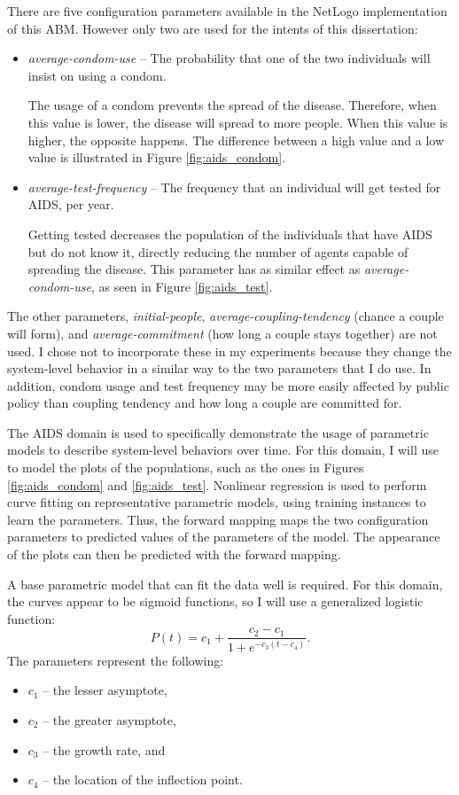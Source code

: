 There are five configuration parameters available in the NetLogo implementation of this ABM.
However only two are used for the intents of this dissertation:
\begin{itemize}
  \item \textit{average-condom-use} -- The probability that one of the two individuals will insist on using a condom.

The usage of a condom prevents the spread of the disease.
Therefore, when this value is lower, the disease will spread to more people.
When this value is higher, the opposite happens.
The difference between a high value and a low value is illustrated in Figure \ref{fig:aids_condom}.

  \item \textit{average-test-frequency} -- The frequency that an individual will get tested for AIDS, per year.

Getting tested decreases the population of the individuals that have AIDS but do not know it, directly reducing the number of agents capable of spreading the disease.
This parameter has as similar effect as \textit{average-condom-use}, as seen in Figure \ref{fig:aids_test}.
\end{itemize}
The other parameters, \textit{initial-people}, \textit{average-coupling-tendency} (chance a couple will form), and \textit{average-commitment} (how long a couple stays together) are not used.
I chose not to incorporate these in my experiments because they change the system-level behavior in a similar way to the two parameters that I do use.
In addition, condom usage and test frequency may be more easily affected by public policy than coupling tendency and how long a couple are committed for.

The AIDS domain is used to specifically demonstrate the usage of parametric models to describe system-level behaviors over time.
For this domain, I will use \fw to model the plots of the populations, such as the ones in Figures \ref{fig:aids_condom} and \ref{fig:aids_test}.
Nonlinear regression is used to perform curve fitting on representative parametric models, using training instances to learn the parameters.
Thus, the forward mapping maps the two configuration parameters to predicted values of the parameters of the model.
The appearance of the plots can then be predicted with the forward mapping.

A base parametric model that can fit the data well is required.
For this domain, the curves appear to be sigmoid functions, so I will use a generalized logistic function:
\[P(t) = c_1 + \displaystyle\frac{c_2 - c_1}{1 + e^{-c_3 (t - c_4)}}.\]
The parameters represent the following:
\begin{itemize}
 \item $c_1$ -- the lesser asymptote,
 \item $c_2$ -- the greater asymptote,
 \item $c_3$ -- the growth rate, and
 \item $c_4$ -- the location of the inflection point.
\end{itemize}

